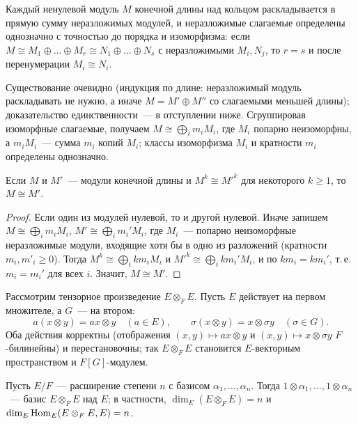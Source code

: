 \begin{theorem}
Каждый ненулевой модуль $M$ конечной длины над кольцом раскладывается в прямую сумму неразложимых модулей, и
неразложимые слагаемые определены однозначно с точностью до порядка и изоморфизма: если
$M\cong M_1\oplus\dots\oplus M_r\cong N_1\oplus\dots\oplus N_s$ с неразложимыми $M_i,N_j$, то $r=s$ и после перенумерации
$M_i\cong N_i$.
\end{theorem}

Существование очевидно (индукция по длине: неразложимый модуль раскладывать не нужно, а иначе $M=M'\oplus M''$ со
слагаемыми меньшей длины); доказательство единственности~--- в отступлении  ниже. Сгруппировав
изоморфные слагаемые, получаем $M\cong\bigoplus_im_iM_i$, где $M_i$ попарно неизоморфны, а $m_iM_i$~--- сумма $m_i$
копий $M_i$; классы изоморфизма $M_i$ и кратности $m_i$ определены однозначно.

\begin{corollary}[5.19g]
Если $M$ и $M'$~--- модули конечной длины и $M^k\cong M'^k$ для некоторого $k\ge1$, то $M\cong M'$.
\end{corollary}

\begin{proof}
Если один из модулей нулевой, то и другой нулевой. Иначе запишем $M\cong\bigoplus_im_iM_i$,
$M'\cong\bigoplus_im_i'M_i$, где $M_i$~--- попарно неизоморфные неразложимые модули, входящие хотя бы в одно из разложений
(кратности $m_i,m'_i\ge0$). Тогда $M^k\cong\bigoplus_ikm_iM_i$ и $M'^k\cong\bigoplus_ikm_i'M_i$, и по 
$km_i=km_i'$, т.\,е.\ $m_i=m_i'$ для всех $i$. Значит, $M\cong M'$.
\end{proof}

Рассмотрим тензорное произведение $E\otimes_FE$. Пусть $E$ действует на первом множителе, а $G$~--- на втором:
\[
a(x\otimes y)=ax\otimes y\quad(a\in E),\qquad \sigma(x\otimes y)=x\otimes\sigma y\quad(\sigma\in G).
\]
Оба действия корректны (отображения $(x,y)\mapsto ax\otimes y$ и $(x,y)\mapsto x\otimes\sigma y$ $F$-билинейны) и
перестановочны; так $E\otimes_FE$ становится $E$-векторным пространством и $F[G]$-модулем.

\begin{lemma}[5.19h]
Пусть $E/F$~--- расширение степени $n$ с базисом $\alpha_1,\dots,\alpha_n$. Тогда $1\otimes\alpha_1,\dots,1\otimes\alpha_n$~---
базис $E\otimes_FE$ над $E$; в частности, $\dim_E(E\otimes_FE)=n$ и $\dim_E\operatorname{Hom}_E(E\otimes_FE,E)=n$.
\end{lemma}

